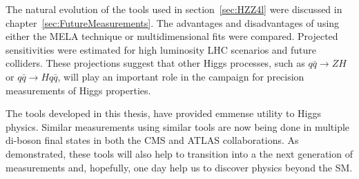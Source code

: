 The natural evolution of the tools used in 
section~\ref{sec:HZZ4l} were discussed in 
chapter~\ref{sec:FutureMeasurements}.  
The advantages and disadvantages of using either the MELA 
technique or multidimensional fits were compared.  Projected
sensitivities were estimated for high luminosity LHC scenarios
and future colliders.  These projections suggest that
other Higgs processes, such as 
$q\bar{q}\to ZH$ or $q\bar{q}\to Hq\bar{q}$, will play 
an important role in the campaign for precision measurements
of Higgs properties.  
  
The tools developed in this thesis, have provided emmense utility
to Higgs physics.  
Similar measurements using similar tools
are now being done in multiple di-boson final states in both 
the CMS and ATLAS collaborations.  As demonstrated, these 
tools will also help to transition into a the next generation
of measurements and, hopefully, one day help us to discover
physics beyond the SM.  




